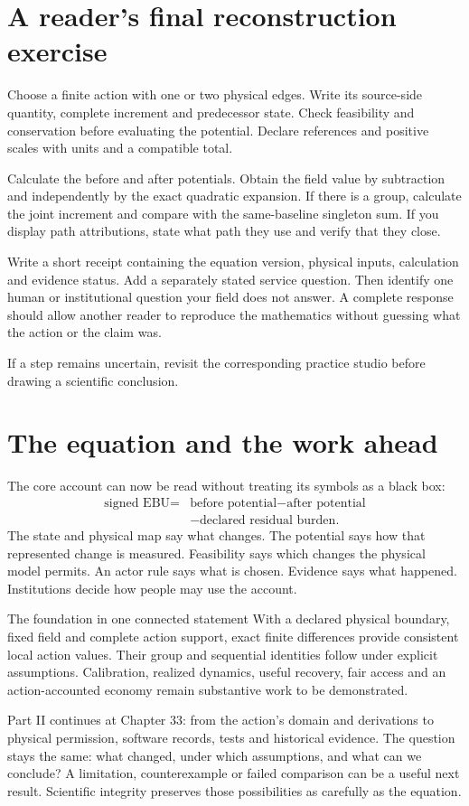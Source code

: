 \section{A reader's final reconstruction exercise}
Choose a finite action with one or two physical edges. Write its source-side quantity, complete increment and predecessor state. Check feasibility and conservation before evaluating the potential. Declare references and positive scales with units and a compatible total.

Calculate the before and after potentials. Obtain the field value by subtraction and independently by the exact quadratic expansion. If there is a group, calculate the joint increment and compare with the same-baseline singleton sum. If you display path attributions, state what path they use and verify that they close.

Write a short receipt containing the equation version, physical inputs, calculation and evidence status. Add a separately stated service question. Then identify one human or institutional question your field does not answer. A complete response should allow another reader to reproduce the mathematics without guessing what the action or the claim was.

If a step remains uncertain, revisit the corresponding practice studio before drawing a scientific conclusion.

\section{The equation and the work ahead}
The core account can now be read without treating its symbols as a black box:
\[
 \boxed{\begin{aligned}\text{signed EBU}={}&\text{before potential}-\text{after potential}\\
 &-\text{declared residual burden}.\end{aligned}}
\]
The state and physical map say what changes. The potential says how that represented change is measured. Feasibility says which changes the physical model permits. An actor rule says what is chosen. Evidence says what happened. Institutions decide how people may use the account.

\begin{lawbox}{The foundation in one connected statement}
With a declared physical boundary, fixed field and complete action support, exact finite differences provide consistent local action values. Their group and sequential identities follow under explicit assumptions. Calibration, realized dynamics, useful recovery, fair access and an action-accounted economy remain substantive work to be demonstrated.
\end{lawbox}

Part II continues at Chapter 33: from the action's domain and derivations to
physical permission, software records, tests and historical evidence. The
question stays the same: what changed, under which assumptions, and what can
we conclude? A limitation, counterexample or failed comparison can be a useful
next result. Scientific integrity preserves those possibilities as carefully
as the equation.

